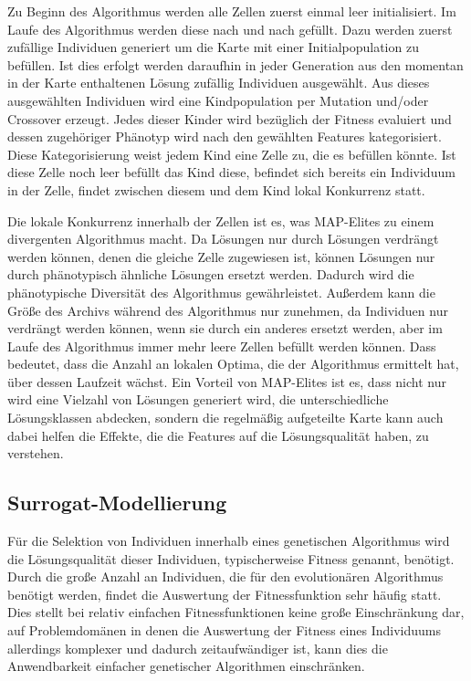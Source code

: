 Zu Beginn des Algorithmus werden alle Zellen zuerst einmal leer initialisiert. 
Im Laufe des Algorithmus werden diese nach und nach gefüllt.
Dazu werden zuerst zufällige Individuen generiert um die Karte mit einer Initialpopulation zu befüllen.
Ist dies erfolgt werden daraufhin in jeder Generation aus den momentan in der Karte enthaltenen Lösung zufällig Individuen ausgewählt.
Aus dieses ausgewählten Individuen wird eine Kindpopulation per Mutation und/oder Crossover erzeugt.
Jedes dieser Kinder wird bezüglich der Fitness evaluiert und dessen zugehöriger Phänotyp wird nach den gewählten Features kategorisiert.
Diese Kategorisierung weist jedem Kind eine Zelle zu, die es befüllen könnte.
Ist diese Zelle noch leer befüllt das Kind diese, befindet sich bereits ein Individuum in der Zelle, findet zwischen diesem und dem Kind lokal Konkurrenz statt.

Die lokale Konkurrenz innerhalb der Zellen ist es, was MAP-Elites zu einem divergenten Algorithmus macht.
Da Lösungen nur durch Lösungen verdrängt werden können, denen die gleiche Zelle zugewiesen ist, können Lösungen nur durch phänotypisch ähnliche Lösungen ersetzt werden.
Dadurch wird die phänotypische Diversität des Algorithmus gewährleistet.
Außerdem kann die Größe des Archivs während des Algorithmus nur zunehmen, da Individuen nur verdrängt werden können, wenn sie durch ein anderes ersetzt werden, aber im Laufe des Algorithmus immer mehr leere Zellen befüllt werden können.
Dass bedeutet, dass die Anzahl an lokalen Optima, die der Algorithmus ermittelt hat, über dessen Laufzeit wächst.
Ein Vorteil von MAP-Elites ist es, dass nicht nur wird eine Vielzahl von Lösungen generiert wird, die unterschiedliche Lösungsklassen abdecken, sondern die regelmäßig aufgeteilte Karte kann auch dabei helfen die Effekte, die die Features auf die Lösungsqualität haben, zu verstehen.


\subsection{Surrogat-Modellierung}

\label{sub:surrogate}
Für die Selektion von Individuen innerhalb eines genetischen Algorithmus wird die Lösungsqualität dieser Individuen, typischerweise Fitness genannt, benötigt.
Durch die große Anzahl an Individuen, die für den evolutionären Algorithmus benötigt werden, findet die Auswertung der Fitnessfunktion sehr häufig statt.
Dies stellt bei relativ einfachen Fitnessfunktionen keine große Einschränkung dar, auf Problemdomänen in denen die Auswertung der Fitness eines Individuums allerdings komplexer und dadurch zeitaufwändiger ist, kann dies die Anwendbarkeit einfacher genetischer Algorithmen einschränken.

